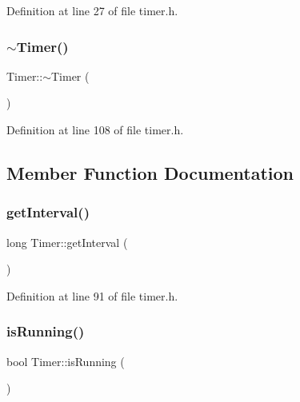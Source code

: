 Definition at line 27 of file timer.\+h.

\mbox{\label{classTimer_a14fa469c4c295c5fa6e66a4ad1092146}} 
\subsubsection{\texorpdfstring{$\sim$\+Timer()}{~Timer()}}
{\footnotesize\ttfamily Timer\+::$\sim$\+Timer (\begin{DoxyParamCaption}{ }\end{DoxyParamCaption})\hspace{0.3cm}{\ttfamily [inline]}}



Definition at line 108 of file timer.\+h.



\subsection{Member Function Documentation}
\mbox{\label{classTimer_a0da8462797c35f5a91e7246eeed32198}} 
\subsubsection{\texorpdfstring{get\+Interval()}{getInterval()}}
{\footnotesize\ttfamily long Timer\+::get\+Interval (\begin{DoxyParamCaption}{ }\end{DoxyParamCaption})\hspace{0.3cm}{\ttfamily [inline]}}



Definition at line 91 of file timer.\+h.

\mbox{\label{classTimer_a2ef50bfc604ea9fb88d3000c9ad0edd9}} 
\subsubsection{\texorpdfstring{is\+Running()}{isRunning()}}
{\footnotesize\ttfamily bool Timer\+::is\+Running (\begin{DoxyParamCaption}{ }\end{DoxyParamCaption})\hspace{0.3cm}{\ttfamily [inline]}}



